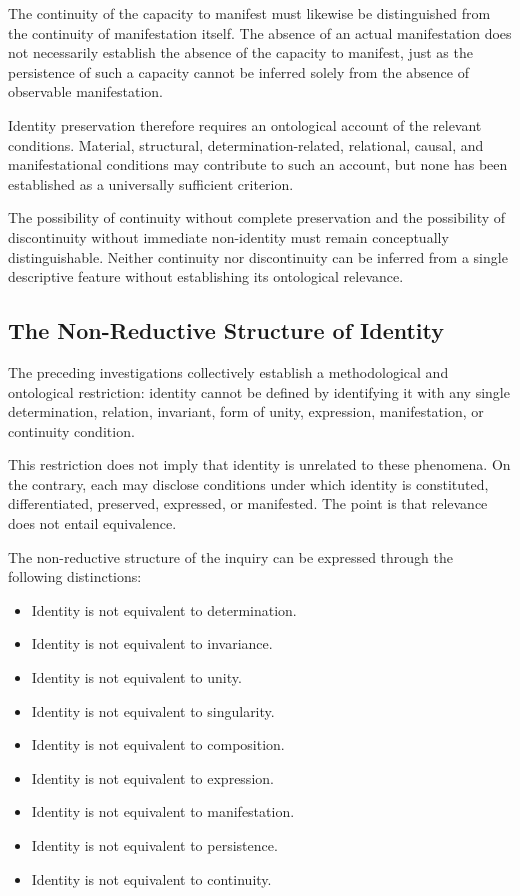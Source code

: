 The continuity of the capacity to manifest must likewise
be distinguished from the continuity of manifestation
itself. The absence of an actual manifestation does not
necessarily establish the absence of the capacity to
manifest, just as the persistence of such a capacity cannot
be inferred solely from the absence of observable
manifestation.

Identity preservation therefore requires an ontological
account of the relevant conditions. Material, structural,
determination-related, relational, causal, and manifestational
conditions may contribute to such an account, but none
has been established as a universally sufficient criterion.

The possibility of continuity without complete preservation
and the possibility of discontinuity without immediate
non-identity must remain conceptually distinguishable.
Neither continuity nor discontinuity can be inferred from
a single descriptive feature without establishing its
ontological relevance.


\subsection{The Non-Reductive Structure of Identity}

The preceding investigations collectively establish a
methodological and ontological restriction: identity cannot
be defined by identifying it with any single determination,
relation, invariant, form of unity, expression, manifestation,
or continuity condition.

This restriction does not imply that identity is unrelated
to these phenomena. On the contrary, each may disclose
conditions under which identity is constituted, differentiated,
preserved, expressed, or manifested. The point is that
relevance does not entail equivalence.

The non-reductive structure of the inquiry can be expressed
through the following distinctions:

\begin{itemize}
    \item Identity is not equivalent to determination.
    \item Identity is not equivalent to invariance.
    \item Identity is not equivalent to unity.
    \item Identity is not equivalent to singularity.
    \item Identity is not equivalent to composition.
    \item Identity is not equivalent to expression.
    \item Identity is not equivalent to manifestation.
    \item Identity is not equivalent to persistence.
    \item Identity is not equivalent to continuity.
\end{itemize}

